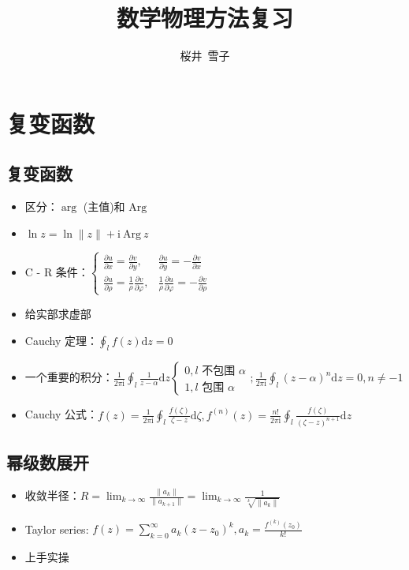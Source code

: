 \documentclass{article}
\title{数学物理方法复习}
\author{桜井\ 雪子}
\date{}
\begin{document}
\maketitle

\section{复变函数}

\subsection{复变函数}

\begin{itemize}
    \item 区分：$\arg$ (主值)和 $\mathrm{Arg}$
    \item $\ln z=\ln\|z\|+\mathrm{i}\ \mathrm{Arg}\ z$
    \item C - R 条件：$\begin{cases}\frac{\partial u}{\partial x}=\frac{\partial v}{\partial y},& \frac{\partial u}{\partial y}=-\frac{\partial v}{\partial x}\\ \frac{\partial u}{\partial \rho}=\frac{1}{\rho}\frac{\partial v}{\partial \varphi},& \frac{1}{\rho}\frac{\partial u}{\partial\varphi}=-\frac{\partial v}{\partial \rho}\end{cases}$
    \item 给实部求虚部
    \item Cauchy 定理：$\oint_lf(z)\mathrm{d}z=0$
    \item 一个重要的积分：$\frac{1}{2\pi\mathrm{i}}\oint_l\frac{1}{z-\alpha}\mathrm{d}z\begin{cases}0, l \text{ 不包围 }\alpha\\ 1, l\text{ 包围 }\alpha\end{cases}; \frac{1}{2\pi\mathrm{i}}\oint_l(z-\alpha)^n\mathrm{d}z=0, n\neq-1$
    \item Cauchy 公式：$f(z)=\frac{1}{2\pi\mathrm{i}}\oint_l\frac{f(\zeta)}{\zeta-z}\mathrm{d}\zeta, f^{(n)}(z)=\frac{n!}{2\pi\mathrm{i}}\oint_l\frac{f(\zeta)}{(\zeta-z)^{n+1}}\mathrm{d}z$
\end{itemize}

\subsection{幂级数展开}

\begin{itemize}
    \item 收敛半径：$R=\lim_{k\to\infty}\frac{\|a_k\|}{\|a_{k+1}\|}=\lim_{k\to\infty}\frac{1}{\sqrt[k]{\|a_k\|}}$
    \item Taylor series: $f(z)=\sum^\infty_{k=0}a_k(z-z_0)^k, a_k=\frac{f^{(k)}(z_0)}{k!}$
    \item 上手实操
\end{itemize}
\end{document}
